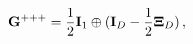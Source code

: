 \begin{equation}
\label{metricD} {\bf G^{+++}}=\frac{1}{2}{\bf I}_1 \oplus ({\bf I}_D -
\frac{1}{2}{\bf\Xi}_D)\, ,
\end{equation} 

